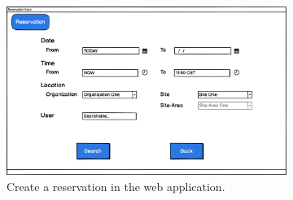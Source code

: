 \begin{figure}[h]
    \centering
    \begin{subfigure}[c]{0.6\textwidth}
        \includegraphics[width=\textwidth]{resources/images/main/5_design/mockups/create_reservation/web/Reservation_Create.png}
        \captionsetup{skip=43pt}
        \caption{Create a reservation in the web application.}
        \label{fig:web-create-reservation-mockup}
    \end{subfigure}
    \hfill
    \begin{subfigure}[c]{0.3\textwidth}

\end{subfigure}
\end{figure}
